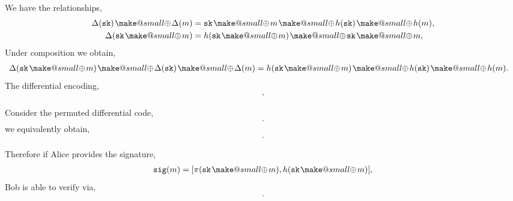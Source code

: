 \documentclass[twocolumn, aps, amsmath, amssymb, nofootinbib, superscriptaddress, longbibliography, doublefloatfix, table-of-contents, eqsecnum, rmp]{revtex4-2}
\makeatletter
\newcommand{\soplus}{{{\hspace{1pt}}{\mathbin{\mathpalette\make@small{\mathbin\oplus}}}}{\hspace{1pt}}}
\newcommand{\make@small}[2]{%
  \vcenter{\hbox{%
    \scalebox{0.6}{$\m@th#1#2$}%
  }}%
}
\makeatother
\begin{document}
We have the relationships,
\begin{align}
	\Delta(\mathtt{sk}) \soplus \Delta(m) &= \mathtt{sk} \soplus m \soplus h(\texttt{sk}) \soplus h(m),\nonumber\\
	\Delta(\mathtt{sk} \soplus m)	 &= h(\mathtt{sk} \soplus m) \soplus \mathtt{sk} \soplus m,\nonumber\\
\end{align}
Under composition we obtain,
\begin{align}
	\Delta(\mathtt{sk} \soplus m)	 \soplus \Delta(\mathtt{sk}) \soplus \Delta(m) &= h(\mathtt{sk} \soplus m) \soplus h(\mathtt{sk}) \soplus h(m).	
\end{align}
The differential encoding,
\begin{align}
	[h(\mathtt{sk}\soplus m), \Delta(\mathtt{sk} \soplus m)],
\end{align}

Consider the permuted differential code,
\begin{align}
	[\pi(\mathtt{sk}\soplus m), \pi(\Delta(\mathtt{sk})) \soplus \pi(\Delta(m))].
\end{align}
we equivalently obtain,
\begin{align}
	[\Delta(\mathtt{sk} \soplus m) \soplus h(\mathtt{sk} \soplus m), \Delta(\mathtt{sk}) \soplus \Delta(m)].
\end{align}

Therefore if Alice provides the signature,
\begin{align}
	\mathtt{sig}(m) = [\pi(\mathtt{sk} \soplus m), h(\mathtt{sk} \soplus m)],
\end{align}	
Bob is able to verify via,
\begin{align}
		[\mathtt{sig}(m),\Delta(\mathtt{sk}) \soplus \Delta(m)].
\end{align}



%


\end{document}
